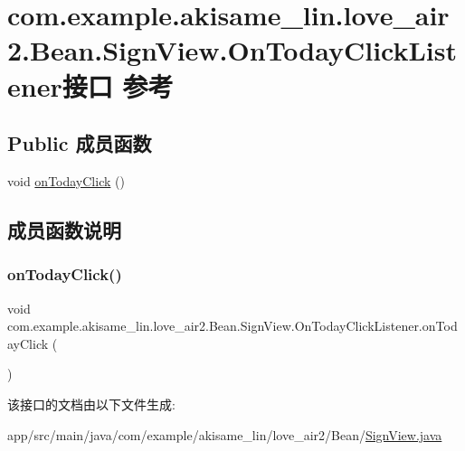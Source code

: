 \hypertarget{interfacecom_1_1example_1_1akisame__lin_1_1love__air2_1_1_bean_1_1_sign_view_1_1_on_today_click_listener}{}\section{com.\+example.\+akisame\+\_\+lin.\+love\+\_\+air2.\+Bean.\+Sign\+View.\+On\+Today\+Click\+Listener接口 参考}
\label{interfacecom_1_1example_1_1akisame__lin_1_1love__air2_1_1_bean_1_1_sign_view_1_1_on_today_click_listener}
\subsection*{Public 成员函数}
\begin{DoxyCompactItemize}
\item 
void \mbox{\hyperlink{interfacecom_1_1example_1_1akisame__lin_1_1love__air2_1_1_bean_1_1_sign_view_1_1_on_today_click_listener_a3951dc53f7f670e9adda08920ae19b69}{on\+Today\+Click}} ()
\end{DoxyCompactItemize}


\subsection{成员函数说明}
\mbox{\label{interfacecom_1_1example_1_1akisame__lin_1_1love__air2_1_1_bean_1_1_sign_view_1_1_on_today_click_listener_a3951dc53f7f670e9adda08920ae19b69}} 
\subsubsection{\texorpdfstring{onTodayClick()}{onTodayClick()}}
{\footnotesize\ttfamily void com.\+example.\+akisame\+\_\+lin.\+love\+\_\+air2.\+Bean.\+Sign\+View.\+On\+Today\+Click\+Listener.\+on\+Today\+Click (\begin{DoxyParamCaption}{ }\end{DoxyParamCaption})}



该接口的文档由以下文件生成\+:\begin{DoxyCompactItemize}
\item 
app/src/main/java/com/example/akisame\+\_\+lin/love\+\_\+air2/\+Bean/\mbox{\hyperlink{_sign_view_8java}{Sign\+View.\+java}}\end{DoxyCompactItemize}
